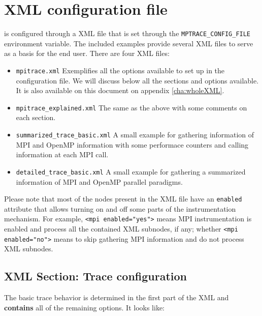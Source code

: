 \chapter{\TRACE XML configuration file}\label{cha:XML}

\TRACE is configured through a XML file that is set through the {\tt MPTRACE\_CONFIG\_FILE} environment variable. The included examples provide several XML files to serve as a basis for the end user. There are four XML files:
\begin{itemize}
 \item {\tt mpitrace.xml} Exemplifies all the options available to set up in the configuration file. We will discuss below all the sections and options available. It is also available on this document on appendix \ref{cha:wholeXML}.
 \item {\tt mpitrace\_explained.xml} The same as the above with some comments on each section.
 \item {\tt summarized\_trace\_basic.xml} A small example for gathering information of MPI and OpenMP information with some performace counters and calling information at each MPI call.
 \item {\tt detailed\_trace\_basic.xml} A small example for gathering a summarized information of MPI and OpenMP parallel paradigms.
\end{itemize}

Please note that most of the nodes present in the XML file have an {\tt enabled} attribute that allows turning on and off some parts of the instrumentation mechanism. For example, {\tt <mpi enabled="yes">} means MPI instrumentation is enabled and process all the contained XML subnodes, if any; whether {\tt <mpi enabled="no">} means to skip gathering MPI information and do not process XML subnodes.

\section{XML Section: Trace configuration}\label{sec:XMLSectionTraceConfiguration}

The basic trace behavior is determined in the first part of the XML and {\bf contains} all of the remaining options. It looks like:




